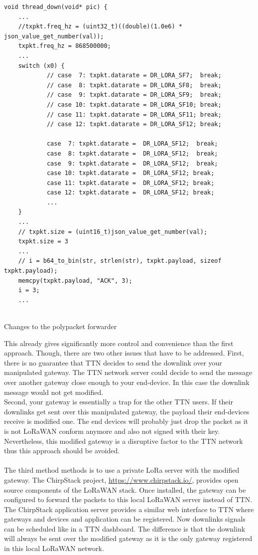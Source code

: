 \begin{listing}[h]
    \begin{verbatim}
void thread_down(void* pic) {
    ...
    //txpkt.freq_hz = (uint32_t)((double)(1.0e6) * json_value_get_number(val));
    txpkt.freq_hz = 868500000;
    ...
    switch (x0) {
            // case  7: txpkt.datarate = DR_LORA_SF7;  break;
            // case  8: txpkt.datarate = DR_LORA_SF8;  break;
            // case  9: txpkt.datarate = DR_LORA_SF9;  break;
            // case 10: txpkt.datarate = DR_LORA_SF10; break;
            // case 11: txpkt.datarate = DR_LORA_SF11; break;
            // case 12: txpkt.datarate = DR_LORA_SF12; break;
            
            case  7: txpkt.datarate =  DR_LORA_SF12;  break;
            case  8: txpkt.datarate =  DR_LORA_SF12;  break;
            case  9: txpkt.datarate =  DR_LORA_SF12;  break;
            case 10: txpkt.datarate =  DR_LORA_SF12; break;
            case 11: txpkt.datarate =  DR_LORA_SF12; break;
            case 12: txpkt.datarate =  DR_LORA_SF12; break;
            ... 
    }
    ...
    // txpkt.size = (uint16_t)json_value_get_number(val);
    txpkt.size = 3
    ... 
    // i = b64_to_bin(str, strlen(str), txpkt.payload, sizeof txpkt.payload);
    memcpy(txpkt.payload, "ACK", 3);
    i = 3;
    ...
           

        \end{verbatim}
        \caption{Changes to the polypacket forwarder}
        \label{lst:polypkt}
\end{listing}

This already gives significantly more control and convenience than the first approach. Though, there are two other issues that have to be addressed.
First, there is no guarantee that TTN decides to send the downlink over your manipulated gateway. The TTN network server could decide to send the message over another gateway close enough to
your end-device. In this case the downlink message would not get modified.
\\
Second, your gateway is essentially a trap for the other TTN users. If their downlinks get sent over this manipulated gateway, 
the payload their end-devices receive is modified one. The end devices will probably just drop the packet as 
it is not LoRaWAN conform anymore and also not signed with their key. Nevertheless, this modified gateway is a disruptive factor 
to the TTN network thus this approach should be avoided.
\\
\\
The third method methods is to use a private LoRa server with the modified gateway. 
The ChirpStack project, \url{https://www.chirpstack.io/}, provides open source components of the LoRaWAN stack. 
Once installed, the gateway can be configured to forward the packets to this local LoRaWAN server instead of TTN. 
The ChirpStack application server provides a similar web interface to TTN where gateways and devices and application can be registered.
Now downlinks signals can be scheduled like in a TTN dashboard. The difference is that the downlink will always be sent over the modified gateway
as it is the only gateway registered in this local LoRaWAN network.

